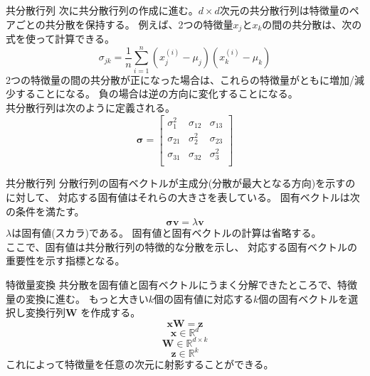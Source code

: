 \documentclass[aspectratio=169, dvipdfmx, 11pt]{beamer} %
\begin{document}
\begin{frame}{共分散行列}
    次に共分散行列の作成に進む。\(d \times d\)次元の共分散行列は特徴量のペアごとの共分散を保持する。
    例えば、2つの特徴量\(x_j\)と\(x_k\)の間の共分散は、次の式を使って計算できる。
    \begin{equation*}
        \sigma_{jk} = \frac{1}{n} \sum_{i=1}^{n} (x_{j}^{(i)} - \mu_j) (x_{k}^{(i)} - \mu_k)
    \end{equation*}
    2つの特徴量の間の共分散が正になった場合は、これらの特徴量がともに増加/減少することになる。
    負の場合は逆の方向に変化することになる。\\
    共分散行列は次のように定義される。
    \begin{equation*}
        \bm{\sigma} = 
        \begin{bmatrix}
            \sigma_{1}^{2} & \sigma_{12} & \sigma_{13} \\
            \sigma_{21} & \sigma_{2}^{2} & \sigma_{23} \\
            \sigma_{31} & \sigma_{32} & \sigma_{3}^{2} \\
        \end{bmatrix}
    \end{equation*}
\end{frame}

\begin{frame}{共分散行列}
    分散行列の固有ベクトルが主成分(分散が最大となる方向)を示すのに対して、
    対応する固有値はそれらの大きさを表している。
    固有ベクトルは次の条件を満たす。
    \begin{equation*}
        \bm{\sigma} \bm{v} = \lambda \bm{v}
    \end{equation*}
    \(\lambda\)は固有値(スカラ)である。
    固有値と固有ベクトルの計算は省略する。\\
    ここで、固有値は共分散行列の特徴的な分散を示し、
    対応する固有ベクトルの重要性を示す指標となる。
\end{frame}

\begin{frame}{特徴量変換}
    共分散を固有値と固有ベクトルにうまく分解できたところで、特徴量の変換に進む。
    もっと大きい\(k\)個の固有値に対応する\(k\)個の固有ベクトルを選択し変換行列\(\bm{W}\)
    を作成する。
    \begin{equation*}
        \bm{xW} = \bm{z}
    \end{equation*}
    \begin{equation*}
        \bm{x} \in \mathbb{R}^{d}
    \end{equation*}
    \begin{equation*}
        \bm{W} \in \mathbb{R}^{d \times k}
    \end{equation*}
    \begin{equation*}
        \bm{z} \in \mathbb{R}^{k}
    \end{equation*}
    これによって特徴量を任意の次元に射影することができる。
\end{frame}
\end{document}
